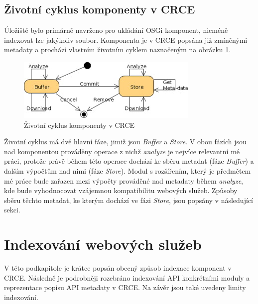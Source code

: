 \documentclass[czech,DP]{thesiskiv}
\begin{document}
\subsection{Životní cyklus komponenty v CRCE}

Úložiště bylo primárně navrženo pro ukládání OSGi komponent, nicméně indexovat lze jakýkoliv soubor. Komponenta je v CRCE popsána již zmíněnými metadaty a prochází vlastním životním cyklem naznačeným na obrázku \ref{fig:crce-comp-lc}.

\begin{figure}[h]
	\centering
	\includegraphics{crce-component-lc.jpg}
	\caption{Životní cyklus komponenty v CRCE}
	\label{fig:crce-comp-lc}
\end{figure} 

Životní cyklus má dvě hlavní fáze, jimiž jsou \textit{Buffer} a \textit{Store}. V obou fázích jsou nad komponentou prováděny operace z nichž \textit{analyze} je nejvíce relevantní mé práci, protože právě během této operace dochází ke sběru metadat (fáze \textit{Buffer}) a dalším výpočtům nad nimi (fáze \textit{Store}). Modul s rozšířením, který je předmětem mé práce bude zařazen mezi výpočty prováděné nad metadaty během \textit{analyze}, kde bude vyhodnocovat vzájemnou kompatibilitu webových služeb. Způsoby sběru těchto metadat, ke kterým dochází ve fázi \textit{Store}, jsou popsány v následující sekci. 

%
%
%
%
%
%
%

\section{Indexování webových služeb}
\label{sec:api-index}

V této podkapitole je krátce popsán obecný způsob indexace komponent v CRCE. Následně je podrobněji rozebráno indexování API konkrétními moduly a reprezentace popisu API metadaty v CRCE. Na závěr jsou také uvedeny limity indexování.
\end{document}
